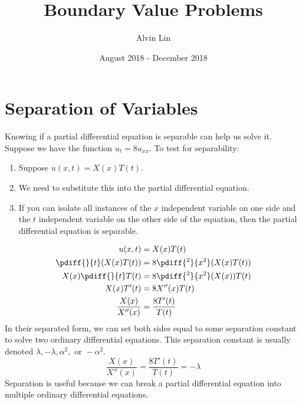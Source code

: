\documentclass{math}
\title{Boundary Value Problems}
\author{Alvin Lin}
\date{August 2018 - December 2018}
\begin{document}
\maketitle

\section*{Separation of Variables}
Knowing if a partial differential equation is separable can help us solve it.
Suppose we have the function \( u_t = 8u_{xx} \). To test for separability:
\begin{enumerate}
  \item Suppose \( u(x,t) = X(x)T(t) \).
  \item We need to substitute this into the partial differential equation.
  \item If you can isolate all instances of the \( x \) independent variable
    on one side and the \( t \) independent variable on the other side of the
    equation, then the partial differential equation is separable.
\end{enumerate}
\begin{align*}
  u(x,t) &= X(x)T(t) \\
  \pdiff{}{t}(X(x)T(t)) &= 8\pdiff{^2}{x^2}(X(x)T(t)) \\
  X(x)\pdiff{}{t}T(t) &= 8\pdiff{^2}{x^2}(X(x))T(t) \\
  X(x)T'(t) &= 8X''(x)T(t) \\
  \frac{X(x)}{X''(x)} &= \frac{8T'(t)}{T(t)}
\end{align*}
In their separated form, we can set both sides equal to some separation constant
to solve two ordinary differential equations. This separation constant is
usually denoted \( \lambda, -\lambda, \alpha^2, \text{ or } -\alpha^2 \).
\[ \frac{X(x)}{X''(x)} = \frac{8T'(t)}{T(t)} = -\lambda \]
Separation is useful because we can break a partial differential equation into
multiple ordinary differential equations.
\end{document}
